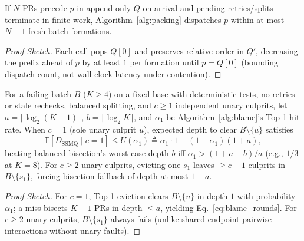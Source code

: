 \begin{proposition}
\label{prop:liveness}
If $N$ PRs precede $p$ in append-only $Q$ on arrival and pending retries/splits terminate in finite work, Algorithm~\ref{alg:packing} dispatches $p$ within at most $N+1$ fresh batch formations.
\end{proposition}
\begin{proof}[Proof Sketch]
Each call pops $Q[0]$ and preserves relative order in $Q'$, decreasing the prefix ahead of $p$ by at least $1$ per formation until $p{=}Q[0]$ (bounding dispatch count, not wall-clock latency under contention).
\end{proof}

\begin{proposition}
\label{prop:complexity}
For a failing batch $B$ ($K\ge 4$) on a fixed base with deterministic tests, no retries or stale rechecks, balanced splitting, and $c\ge 1$ independent unary culprits, let $a=\lceil\log_2(K-1)\rceil$, $b=\lceil\log_2 K\rceil$, and $\alpha_1$ be Algorithm~\ref{alg:blame}'s Top-1 hit rate. When $c=1$ (sole unary culprit $u$), expected depth to clear $B\setminus\{u\}$ satisfies
\begin{equation}
\mathbb{E}[D_{\text{SSMQ}} \mid c=1] \le U(\alpha_1) \triangleq \alpha_1 \cdot 1 + (1 - \alpha_1)(1 + a),
\label{eq:blame_rounds}
\end{equation}
beating balanced bisection's worst-case depth $b$ iff $\alpha_1 > (1+a-b)/a$ (e.g., $1/3$ at $K{=}8$). For $c\ge 2$ unary culprits, evicting one $s_1$ leaves $\ge c-1$ culprits in $B\setminus\{s_1\}$, forcing bisection fallback of depth at most $1+a$.
\end{proposition}
\begin{proof}[Proof Sketch]
For $c=1$, Top-1 eviction clears $B\setminus\{u\}$ in depth $1$ with probability $\alpha_1$; a miss bisects $K-1$ PRs in depth $\le a$, yielding Eq.~\eqref{eq:blame_rounds}. For $c\ge 2$ unary culprits, $B\setminus\{s_1\}$ always fails (unlike shared-endpoint pairwise interactions without unary faults).
\end{proof}
